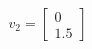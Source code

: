\documentclass[preview]{standalone}
\begin{document}
\begin{align*}
v_2 = \begin{bmatrix} 0 \\ 1.5 \end{bmatrix}
\end{align*}
\end{document}
